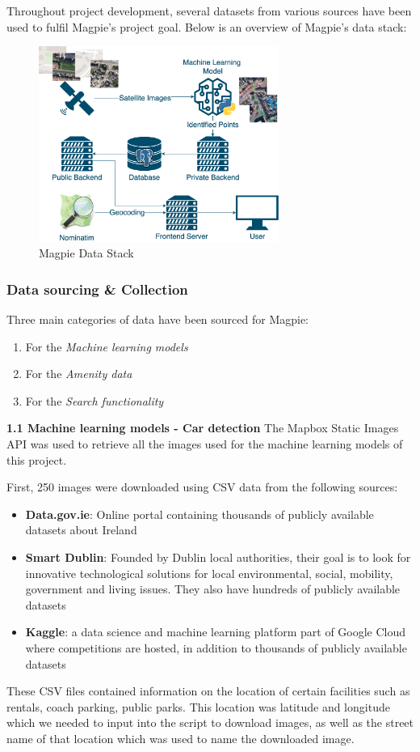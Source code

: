 Throughout project development, several datasets from various sources have been
used to fulfil Magpie's project goal. Below is an overview of Magpie's data
stack:
\begin{figure}[htbp]
    \centering
    \includegraphics[width=0.7\textwidth]{images/magpie-data-stack.png}
    \caption{Magpie Data Stack}
\end{figure}

\subsubsection{Data sourcing \& Collection}
Three main categories of data have been sourced for Magpie:
\begin{enumerate}
    \item For the \emph{Machine learning models}
    \item For the \emph{Amenity data}
    \item For the \emph{Search functionality}
\end{enumerate}

\textbf{1.1 Machine learning models - Car detection}
The Mapbox Static Images API was used to retrieve all the images used for the
machine learning models of this project.

First, 250 images were downloaded using CSV data from the following sources:
\begin{itemize}
    \item \textbf{Data.gov.ie}: Online portal containing thousands of publicly
          available datasets about Ireland
    \item \textbf{Smart Dublin}: Founded by Dublin local authorities, their goal
          is to look for innovative technological solutions for local environmental,
          social, mobility, government and living issues. They also have hundreds of
          publicly available datasets
    \item \textbf{Kaggle}: a data science and machine learning platform part of
          Google Cloud where competitions are hosted, in addition to thousands of
          publicly available datasets
\end{itemize}
These CSV files contained information on the location of certain facilities such
as rentals, coach parking, public parks. This location was latitude and
longitude which we needed to input into the script to download images, as well
as the street name of that location which was used to name the downloaded image.

